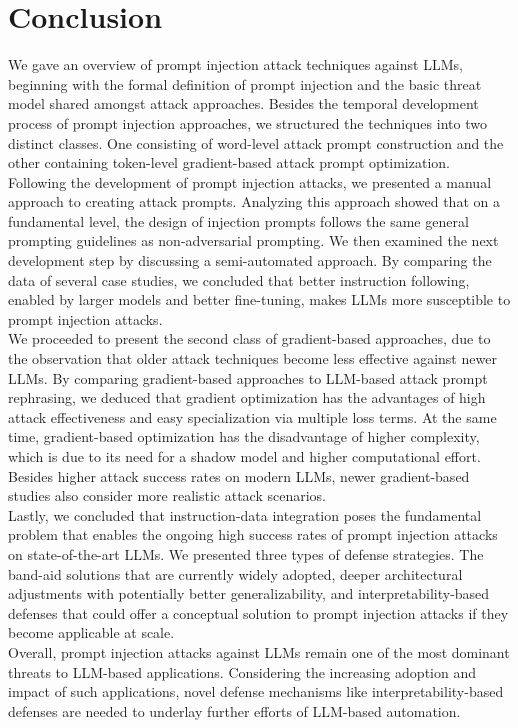 \section{Conclusion}
We gave an overview of prompt injection attack techniques against LLMs, beginning with the formal definition of prompt injection and the basic threat model shared amongst attack approaches.
Besides the temporal development process of prompt injection approaches, we structured the techniques into two distinct classes.
One consisting of word-level attack prompt construction and the other containing token-level gradient-based attack prompt optimization.\\

Following the development of prompt injection attacks, we presented a manual approach to creating attack prompts.
Analyzing this approach showed that on a fundamental level, the design of injection prompts follows the same general prompting guidelines as non-adversarial prompting.
We then examined the next development step by discussing a semi-automated approach.
By comparing the data of several case studies, we concluded that better instruction following, enabled by larger models and better fine-tuning, makes LLMs more susceptible to prompt injection attacks.\\

We proceeded to present the second class of gradient-based approaches, due to the observation that older attack techniques become less effective against newer LLMs.
By comparing gradient-based approaches to LLM-based attack prompt rephrasing, we deduced that gradient optimization has the advantages of high attack effectiveness and easy specialization via multiple loss terms.
At the same time, gradient-based optimization has the disadvantage of higher complexity, which is due to its need for a shadow model and higher computational effort.
Besides higher attack success rates on modern LLMs, newer gradient-based studies also consider more realistic attack scenarios.\\

Lastly, we concluded that instruction-data integration poses the fundamental problem that enables the ongoing high success rates of prompt injection attacks on state-of-the-art LLMs.
We presented three types of defense strategies.
The band-aid solutions that are currently widely adopted, deeper architectural adjustments with potentially better generalizability, and interpretability-based defenses that could offer a conceptual solution to prompt injection attacks if they become applicable at scale.\\

Overall, prompt injection attacks against LLMs remain one of the most dominant threats to LLM-based applications.
Considering the increasing adoption and impact of such applications, novel defense mechanisms like interpretability-based defenses are needed to underlay further efforts of LLM-based automation.